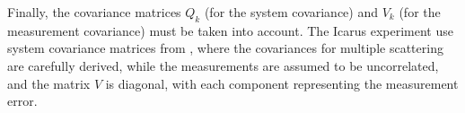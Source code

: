 Finally, the covariance matrices $Q_k$ (for the system covariance) and $V_k$ (for the measurement covariance) must be taken into account. The Icarus experiment use system covariance matrices from \citep{Wolin1993}, where the covariances for multiple scattering are carefully derived, while the measurements are assumed to be uncorrelated, and the matrix $V$ is diagonal, with each component representing the measurement error.
